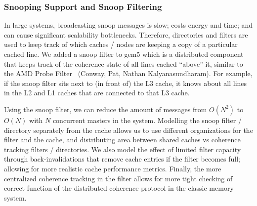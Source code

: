 \subsubsection[Snooping Support and Snoop Filtering]{Snooping Support and Snoop Filtering}

In large systems, broadcasting snoop messages is slow; costs energy and time; and can cause significant scalability bottlenecks.
Therefore, directories and filters are used to keep track of which caches / nodes are keeping a copy of a particular cached line.
We added a snoop filter to gem5 which is a distributed component that keeps track of the coherence state of all lines cached “above” it, similar to the AMD Probe Filter~\cite{} (Conway, Pat, Nathan Kalyanasundharam).
For example, if the snoop filter sits next to (in front of) the L3 cache, it knows about all lines in the L2 and L1 caches that are connected to that L3 cache.

Using the snoop filter, we can reduce the amount of messages from $O(N^2)$ to $O(N)$ with $N$ concurrent masters in the system.
Modelling the snoop filter / directory separately from the cache allows us to use different organizations for the filter and the cache, and distributing area between shared caches vs coherence tracking filters / directories.
We also model the effect of limited filter capacity through back-invalidations that remove cache entries if the filter becomes full; allowing for more realistic cache performance metrics.
Finally, the more centralized coherence tracking in the filter allows for more tight checking of correct function of the distributed coherence protocol in the classic memory system.
